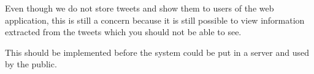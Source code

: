 Even though we do not store tweets and show them to users of the web
application, this is still a concern because it is still possible to view
information extracted from the tweets which you should not be able to see. \nl

This should be implemented before the system could be put in a server and used
by the public.
